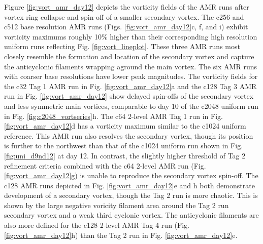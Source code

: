 \documentclass{ametsoc}
\begin{document}
Figure \ref{fig:vort_amr_day12} depicts the vorticity fields of the AMR runs after vortex ring collapse
and spin-off of a smaller secondary vortex. The c256 and c512 base resolution AMR runs (Figs.
\ref{fig:vort_amr_day12}c, f, and i) exhibit vorticity 
maximums roughly 10\% higher than their corresponding high resolution 
uniform runs reflecting Fig. \ref{fig:vort_lineplot}. These three AMR runs most closely resemble
the formation and location of the secondary vortex and capture the anticyclonic
 filaments wrapping aground the main vortex.
The six AMR runs with coarser base resolutions have lower peak magnitudes. The 
vorticity fields for the c32 Tag 1 AMR run in Fig. \ref{fig:vort_amr_day12}a and the
c128 Tag 3 AMR run in Fig. \ref{fig:vort_amr_day12} show delayed spin-offs of 
the secondary vortex and less symmetric main vortices,
comparable to day 10 of the c2048 uniform run in Fig. \ref{fig:c2048_vortseries}h.
The c64 2-level AMR Tag 1 run in Fig. \ref{fig:vort_amr_day12}d has a vorticity 
maximum similar to the c1024 uniform reference. This AMR run also resolves 
the secondary vortex, though its position is further to the northwest than that of the c1024 uniform run shown
in Fig. \ref{fig:uni_d9nd12} at day 12. In contrast,
the slightly higher threshold of Tag 2 refinement criteria 
combined with the c64 2-level AMR run (Fig. \ref{fig:vort_amr_day12}g) 
is unable to reproduce the secondary vortex spin-off. The
c128 AMR runs depicted in Fig. \ref{fig:vort_amr_day12}e and h both demonstrate development of
a secondary vortex, though the Tag 2 run is more chaotic.
This is shown by the large negative voricity filament area around the Tag 2 run secondary vortex and a weak third cyclonic vortex.
The anticyclonic filaments are also more defined for the c128 2-level AMR Tag 4 run (Fig. \ref{fig:vort_amr_day12}h)
than the Tag 2 run in Fig. \ref{fig:vort_amr_day12}e.
\end{document}
